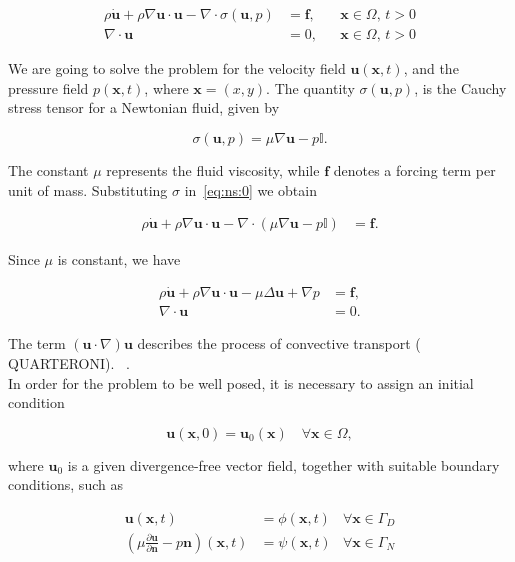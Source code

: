 \documentclass[a4paper,11pt,openright,twoside]{book}
\begin{document}
\begin{align}
\label{eq:ns:0}
\rho \dot{\mathbf{u}}
+ \rho \nabla \mathbf{u} \cdot \mathbf{u}
- \nabla \cdot \sigma(\mathbf{u},p)
&= \mathbf{f},  && \mathbf{x} \in \Omega, \, t>0 \\
\nabla \cdot \mathbf{u} &= 0, && \mathbf{x} \in \Omega, \, t>0
\end{align}

We are going to solve the problem for the velocity field $\mathbf{u}(\mathbf{x},t)$, and the pressure field $p(\mathbf{x},t)$, where $\mathbf{x} = (x,y)$. The quantity $\sigma(\mathbf{u}, p)$, is the Cauchy stress tensor for a Newtonian fluid, given by

\begin{equation}
\sigma(\mathbf{u}, p) = \mu \nabla \mathbf{u} - p \mathbb{I}.
\end{equation}

The constant $\mu$ represents the fluid viscosity, while $\mathbf{f}$ denotes a forcing term per unit of mass. Substituting $\sigma$ in~\eqref{eq:ns:0} we obtain

\begin{align}
\rho \dot{\mathbf{u}} + \rho \nabla \mathbf{u} \cdot \mathbf{u} - \nabla \cdot (\mu \nabla \mathbf{u} - p \mathbb{I}) &= \mathbf{f}.
\end{align}

Since $\mu$ is constant, we have

\begin{align}
\label{eq:ns:3}
\rho \dot{\mathbf{u}} + \rho \nabla \mathbf{u} \cdot \mathbf{u} - \mu \Delta \mathbf{u} +  \nabla p &= \mathbf{f}, \\
\label{eq:ns:3bis}
\nabla \cdot \mathbf{u} &= 0.
\end{align}

The term $(\mathbf{u} \cdot \nabla)\mathbf{u}$ describes the process of convective transport (	QUARTERONI). ~\cite{}.\\
In order for the problem to be well posed, it is necessary to assign an initial condition

\begin{equation}
\mathbf{u} (\mathbf{x}, 0) = \mathbf{u}_0(\mathbf{x}) \quad \forall \mathbf{x} \in \Omega,
\end{equation}

where $\mathbf{u}_0$ is a given divergence-free vector field, together with suitable boundary conditions, such as

\begin{align}
\mathbf{u}(\mathbf{x},t) &= \phi (\mathbf{x}, t) & \forall \mathbf{x} \in \Gamma_D \\
\label{eq:ns:8}
\left( \mu \frac{\partial \mathbf{u}}{\partial \mathbf{n}} - p\mathbf{n} \right) (\mathbf{x},t) &= \psi(\mathbf{x},t) & \forall \mathbf{x} \in \Gamma_N
\end{align}
\end{document}
